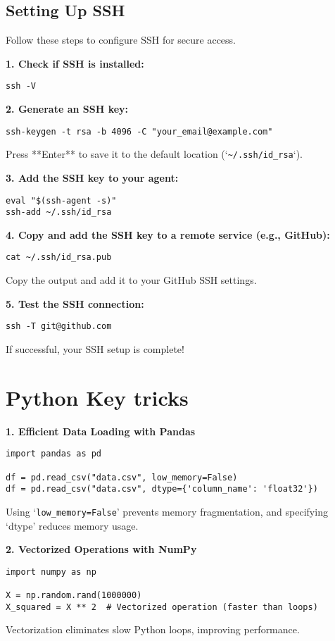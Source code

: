 \subsection{Setting Up SSH}

Follow these steps to configure SSH for secure access.

\textbf{1. Check if SSH is installed:}
\begin{lstlisting}
ssh -V
\end{lstlisting}

\textbf{2. Generate an SSH key:}
\begin{lstlisting}
ssh-keygen -t rsa -b 4096 -C "your_email@example.com"
\end{lstlisting}

Press **Enter** to save it to the default location (`\verb|~/.ssh/id_rsa|`).

\textbf{3. Add the SSH key to your agent:}
\begin{lstlisting}
eval "$(ssh-agent -s)"
ssh-add ~/.ssh/id_rsa
\end{lstlisting}

\textbf{4. Copy and add the SSH key to a remote service (e.g., GitHub):}
\begin{lstlisting}
cat ~/.ssh/id_rsa.pub
\end{lstlisting}

Copy the output and add it to your GitHub SSH settings.

\textbf{5. Test the SSH connection:}
\begin{lstlisting}
ssh -T git@github.com
\end{lstlisting}

If successful, your SSH setup is complete!

\section{Python Key tricks}

\textbf{1. Efficient Data Loading with Pandas}
\begin{verbatim}
import pandas as pd

df = pd.read_csv("data.csv", low_memory=False)
df = pd.read_csv("data.csv", dtype={'column_name': 'float32'})
\end{verbatim}
Using `\verb|low_memory=False|' prevents memory fragmentation, and specifying `dtype' reduces memory usage.

\textbf{2. Vectorized Operations with NumPy}
\begin{verbatim}
import numpy as np

X = np.random.rand(1000000)
X_squared = X ** 2  # Vectorized operation (faster than loops)
\end{verbatim}
Vectorization eliminates slow Python loops, improving performance.


